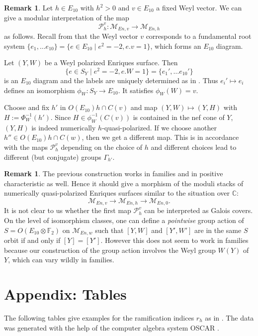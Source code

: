\documentclass{amsart}
\theoremstyle{definition}
\newtheorem{remark}[definition]{Remark}
\theoremstyle{plain}
\newcommand{\FF}{\mathbb{F}}
\newcommand{\CC}{\mathbb{C}}
\newcommand{\M}{\mathcal{M}}
\renewcommand{\P}{\mathcal{P}}
\begin{document}
\begin{remark}\label{rmk:modular_w_h}
Let $h \in E_{10}$ with $h^2>0$ and $v \in E_{10}$ a fixed Weyl vector. We can give a modular interpretation of the map
\[\P^v_h \colon \M_{En,v} \to \M_{En, h} \]
as follows.
Recall from  that the Weyl vector $v$ corresponds to a fundamental root system $\{e_1,\dots e_{10}\}=\{e \in E_{10} \mid e^2 = -2, e.v =1\}$, which forms an $E_{10}$ diagram.

Let $(Y,W)$ be a Weyl polarized Enriques surface. Then \[\{e \in S_Y \mid e^2 = -2, e.W=1\} = \{e_1',\dots e_{10}'\}\]
is an $E_{10}$ diagram and the labels are uniquely determined as in . Thus $e_i' \mapsto e_i$ defines an isomorphism $\phi_W \colon S_Y \to E_{10}$.
It satisfies $\phi_W(W) = v$. %

Choose and fix $h'$ in $O(E_{10})h\cap C(v)$ and map
$(Y,W) \mapsto (Y,H)$ with $H:=\Phi_W^{-1}(h')$. Since $H \in \phi_W^{-1}(C(v))$ is contained in the nef cone of $Y$, $(Y,H)$ is indeed numerically $h$-quasi-polarized.
If we choose another $h'' \in O(E_{10})h \cap C(w)$, then we get a different map. This is in accordance with the maps $\P^v_h$ depending on the choice of $h$ and different choices lead to different (but conjugate) groups $\Gamma_{h'}$.

\end{remark}
\begin{remark}
The previous construction works in families and in positive characteristic as well. Hence it should give a morphism of the moduli stacks of numerically quasi-polarized Enriques surfaces similar to the situation over $\CC$:
\[\M_{En,v}\to \M_{En,h} \to \M_{En,0}.\]
It is not clear to us whether the first map $\P^v_h$ can be interpreted as Galois covers. On the level of isomorphism classes, one can define a \emph{pointwise} group action of $S=O(E_{10} \otimes \FF_2)$ on $\M_{En,w}$ such that $[Y,W]$ and $[Y',W']$ are in the same $S$ orbit if and only if $[Y]=[Y']$. However this does not seem to work in families because our construction of the group action involves the Weyl group $W(Y)$ of $Y$, which can vary wildly in families.
\end{remark}






\section{Appendix: Tables}
The following tables give examples for the ramification indices $r_h$ as in .
The data was generated with the help of the computer algebra system OSCAR \cite{OSCAR,OSCAR-book}.
\end{document}
